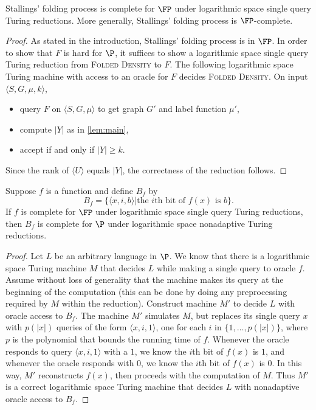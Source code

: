 \documentclass{article}
\newcommand{\FD}{\textsc{Folded Density}}
\newcommand{\gen}[1]{\langle #1 \rangle}
\begin{document}
\begin{theorem}\label{thm:fpcomplete}
  Stallings' folding process is complete for $\FP$ under logarithmic space single query Turing reductions.
  More generally, Stallings' folding process is $\FP$-complete.
\end{theorem}
\begin{proof}
  As stated in the introduction, Stallings' folding process is in $\FP$.
  In order to show that $F$ is hard for $\P$, it suffices to show a logarithmic space single query Turing reduction from \FD{} to $F$.
  The following logarithmic space Turing machine with access to an oracle for $F$ decides \FD{}.
  On input $\langle S, G, \mu, k \rangle$,
  \begin{itemize}
  \item query $F$ on $\langle S, G, \mu \rangle$ to get graph $G'$ and label function $\mu'$,
  \item compute $|Y|$ as in \autoref{lem:main},
  \item accept if and only if $|Y| \geq k$.
  \end{itemize}
  Since the rank of $\gen{U}$ equals $|Y|$, the correctness of the reduction follows.
\end{proof}

\begin{lemma}\label{lem:nonadaptive}
  Suppose $f$ is a function and define $B_f$ by
  \begin{equation*}
    B_f = \{ \langle x, i, b \rangle | \text{the } i \text{th bit of } f(x) \text{ is } b \}.
  \end{equation*}
  If $f$ is complete for $\FP$ under logarithmic space single query Turing reductions, then $B_f$ is complete for $\P$ under logarithmic space nonadaptive Turing reductions.
\end{lemma}
\begin{proof}
  Let $L$ be an arbitrary language in $\P$.
  We know that there is a logarithmic space Turing machine $M$ that decides $L$ while making a single query to oracle $f$.
  Assume without loss of generality that the machine makes its query at the beginning of the computation (this can be done by doing any preprocessing required by $M$ within the reduction).
  Construct machine $M'$ to decide $L$ with oracle access to $B_f$.
  The machine $M'$ simulates $M$, but replaces its single query $x$ with $p(|x|)$ queries of the form $\langle x, i, 1 \rangle$, one for each $i$ in $\{1, \dotsc, p(|x|) \}$, where $p$ is the polynomial that bounds the running time of $f$.
  Whenever the oracle responds to query $\langle x, i, 1 \rangle$ with a $1$, we know the $i$th bit of $f(x)$ is $1$, and whenever the oracle responds with $0$, we know the $i$th bit of $f(x)$ is $0$.
  In this way, $M'$ reconstructs $f(x)$, then proceeds with the computation of $M$.
  Thus $M'$ is a correct logarithmic space Turing machine that decides $L$ with nonadaptive oracle access to $B_f$.
\end{proof}
\end{document}
